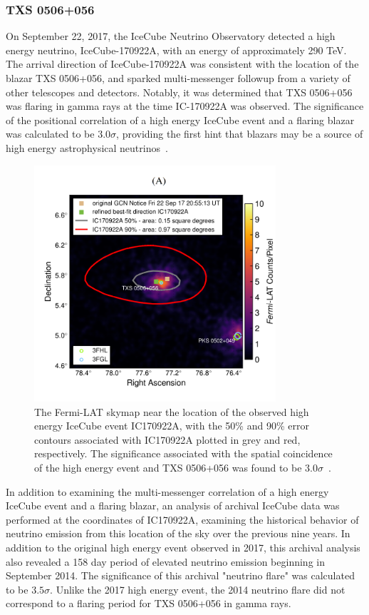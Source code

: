 \subsubsection{TXS 0506+056}
On September 22, 2017, the IceCube Neutrino Observatory detected a high energy neutrino, IceCube-170922A, with an energy of approximately 290 TeV. The arrival direction of IceCube-170922A was consistent with the location of the blazar TXS 0506+056, and sparked multi-messenger followup from a variety of other telescopes and detectors. Notably, it was determined that TXS 0506+056 was flaring in gamma rays at the time IC-170922A was observed. The significance of the positional correlation of a high energy IceCube event and a flaring blazar was calculated to be $3.0 \sigma$, providing the first hint that blazars may be a source of high energy astrophysical neutrinos~\cite{TXS_Multimessenger}.

\begin{figure}[h]
\centering
\includegraphics[width=0.8\textwidth]{figs/FermiMap.png}
\caption{The Fermi-LAT skymap near the location of the observed high energy IceCube event IC170922A, with the 50\% and 90\% error contours associated with IC170922A plotted in grey and red, respectively. The significance associated with the spatial coincidence of the high energy event and TXS 0506+056 was found to be $3.0 \sigma$~\cite{TXS_Multimessenger}. }
\label{fig:FermiMap}
\end{figure}

In addition to examining the multi-messenger correlation of a high energy IceCube event and a flaring blazar, an analysis of archival IceCube data was performed at the coordinates of IC170922A, examining the historical behavior of neutrino emission from this location of the sky over the previous nine years. In addition to the original high energy event observed in 2017, this archival analysis also revealed a 158 day period of elevated neutrino emission beginning in September 2014. The significance of this archival "neutrino flare" was calculated to be $3.5\sigma$. Unlike the 2017 high energy event, the 2014 neutrino flare did not correspond to a flaring period for TXS 0506+056 in gamma rays.~\cite{TXS_Archival}

